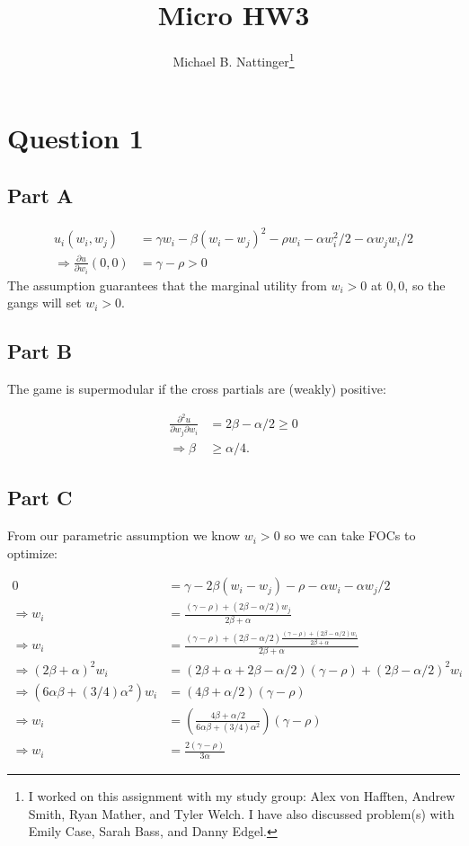 \documentclass[11pt]{article} %
\title{Micro HW3}
\author{Michael B. Nattinger\footnote{I worked on this assignment with my study group: Alex von Hafften, Andrew Smith, Ryan Mather, and Tyler Welch. I have also discussed problem(s) with Emily Case, Sarah Bass, and Danny Edgel.}}
\begin{document}
\maketitle

\section{Question 1}
\subsection{Part A}
\begin{align*}
u_i(w_i,w_j) &= \gamma w_i - \beta(w_i - w_j)^2 - \rho w_i - \alpha w_i^2/2 - \alpha w_jw_i/2\\
\Rightarrow \frac{\partial u}{\partial w_i}(0,0) &= \gamma-\rho>0 
\end{align*}
The assumption guarantees that the marginal utility from $w_i>0$ at $0,0$, so the gangs will set $w_i>0$.
\subsection{Part B}
The game is supermodular if the cross partials are (weakly) positive:

\begin{align*}
\frac{\partial^2 u}{\partial w_j \partial w_i} &= 2\beta - \alpha/2 \geq0 \\
\Rightarrow \beta&\geq\alpha/4.
\end{align*}
\subsection{Part C}
From our parametric assumption we know $w_i>0$ so we can take FOCs to optimize:

\begin{align*}
0 &= \gamma - 2\beta (w_i - w_j) - \rho -\alpha w_i - \alpha w_j/2\\
\Rightarrow w_i &= \frac{(\gamma-\rho) + (2\beta -\alpha/2)w_j }{2\beta +\alpha}\\
\Rightarrow w_i &= \frac{(\gamma-\rho) + (2\beta -\alpha/2)\frac{(\gamma-\rho) + (2\beta -\alpha/2)w_i }{2\beta +\alpha} }{2\beta +\alpha}\\
\Rightarrow (2\beta + \alpha)^2 w_i &= (2\beta+\alpha + 2\beta - \alpha/2)(\gamma - \rho) + (2\beta - \alpha/2)^2 w_i\\
\Rightarrow (6\alpha\beta + (3/4)\alpha^2)w_i &= (4\beta + \alpha/2)(\gamma - \rho)\\
\Rightarrow  w_i &= \left( \frac{4\beta+ \alpha/2}{6\alpha \beta + (3/4)\alpha^2} \right)(\gamma - \rho)\\
\Rightarrow w_i &= \frac{2(\gamma-\rho)}{3\alpha}
\end{align*}
\end{document}
